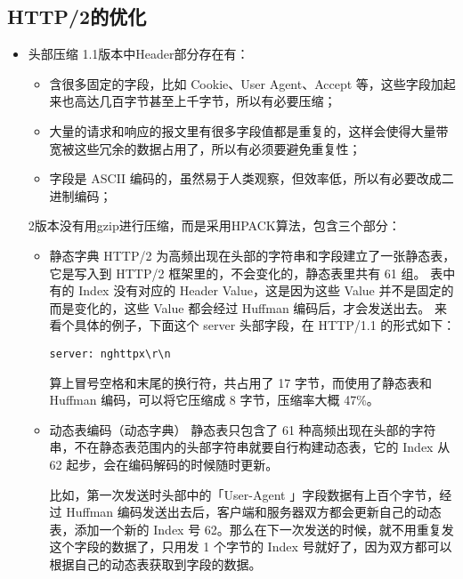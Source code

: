 \documentclass[11pt]{article}
\begin{document}
\subsection{HTTP/2的优化}
\label{sec:orgb80124f}
\begin{itemize}
\item 头部压缩
1.1版本中Header部分存在有：
\begin{itemize}
\item 含很多固定的字段，比如 Cookie、User Agent、Accept 等，这些字段加起来也高达几百字节甚至上千字节，所以有必要压缩；
\item 大量的请求和响应的报文里有很多字段值都是重复的，这样会使得大量带宽被这些冗余的数据占用了，所以有必须要避免重复性；
\item 字段是 ASCII 编码的，虽然易于人类观察，但效率低，所以有必要改成二进制编码；
\end{itemize}
2版本没有用gzip进行压缩，而是采用HPACK算法，包含三个部分：
\begin{itemize}
\item 静态字典
HTTP/2 为高频出现在头部的字符串和字段建立了一张静态表，它是写入到 HTTP/2 框架里的，不会变化的，静态表里共有 61 组。
表中有的 Index 没有对应的 Header Value，这是因为这些 Value 并不是固定的而是变化的，这些 Value 都会经过 Huffman 编码后，才会发送出去。
来看个具体的例子，下面这个 server 头部字段，在 HTTP/1.1 的形式如下：
\begin{verbatim}
server: nghttpx\r\n
\end{verbatim}
算上冒号空格和末尾的换行符，共占用了 17 字节，而使用了静态表和 Huffman 编码，可以将它压缩成 8 字节，压缩率大概 47\%。
\item 动态表编码（动态字典）
静态表只包含了 61 种高频出现在头部的字符串，不在静态表范围内的头部字符串就要自行构建动态表，它的 Index 从 62 起步，会在编码解码的时候随时更新。

比如，第一次发送时头部中的「User-Agent 」字段数据有上百个字节，经过 Huffman 编码发送出去后，客户端和服务器双方都会更新自己的动态表，添加一个新的 Index 号 62。那么在下一次发送的时候，就不用重复发这个字段的数据了，只用发 1 个字节的 Index 号就好了，因为双方都可以根据自己的动态表获取到字段的数据。


\end{itemize}
\end{itemize}
\end{document}
